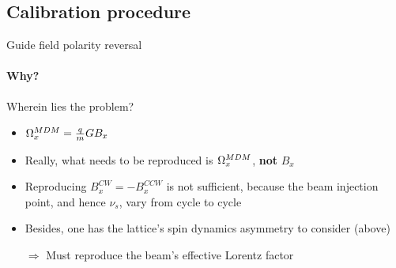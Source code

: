 \documentclass[14pt]{beamer}
\begin{document}
\subsection{Calibration procedure}
\begin{frame}{Guide field polarity reversal}
	\framesubtitle{Why?}\centering
\end{frame}
\begin{frame}{Wherein lies the problem?}
	\begin{itemize}[<+->]
		\item $\Omega_x^{MDM} = \frac qmGB_x$
		\item Really, what needs to be reproduced is $\Omega_x^{MDM}$, \textbf{not} $B_x$
		\item Reproducing $B_x^{CW} = -B_x^{CCW}$ is not sufficient, because the beam injection point, and hence $\nu_s$, vary from cycle to cycle
		\item Besides, one has the lattice's spin dynamics asymmetry to consider (above)
		\item[$\Rightarrow$] Must reproduce the beam's effective Lorentz factor
	\end{itemize}
\end{frame}
\end{document}
